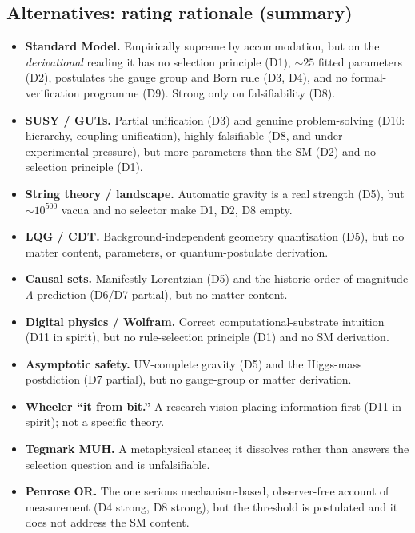 \documentclass[11pt]{article}
\begin{document}
\begin{appendices}
\subsection*{Alternatives: rating rationale (summary)}

\begin{itemize}[leftmargin=1.4em,itemsep=2pt]
\item \textbf{Standard Model.}  Empirically supreme by accommodation, but on the
  \emph{derivational} reading it has no selection principle (D1), $\sim 25$ fitted
  parameters (D2), postulates the gauge group and Born rule (D3, D4), and no
  formal-verification programme (D9).  Strong only on falsifiability (D8).
\item \textbf{SUSY / GUTs.}  Partial unification (D3) and genuine problem-solving
  (D10: hierarchy, coupling unification), highly falsifiable (D8, and under
  experimental pressure), but more parameters than the SM (D2) and no selection
  principle (D1).
\item \textbf{String theory / landscape.}  Automatic gravity is a real strength
  (D5), but $\sim 10^{500}$ vacua and no selector make D1, D2, D8 empty.
\item \textbf{LQG / CDT.}  Background-independent geometry quantisation (D5), but
  no matter content, parameters, or quantum-postulate derivation.
\item \textbf{Causal sets.}  Manifestly Lorentzian (D5) and the historic
  order-of-magnitude $\Lambda$ prediction (D6/D7 partial), but no matter content.
\item \textbf{Digital physics / Wolfram.}  Correct computational-substrate
  intuition (D11 in spirit), but no rule-selection principle (D1) and no SM
  derivation.
\item \textbf{Asymptotic safety.}  UV-complete gravity (D5) and the Higgs-mass
  postdiction (D7 partial), but no gauge-group or matter derivation.
\item \textbf{Wheeler ``it from bit.''}  A research vision placing information
  first (D11 in spirit); not a specific theory.
\item \textbf{Tegmark MUH.}  A metaphysical stance; it dissolves rather than answers
  the selection question and is unfalsifiable.
\item \textbf{Penrose OR.}  The one serious mechanism-based, observer-free account of
  measurement (D4 strong, D8 strong), but the threshold is postulated and it does
  not address the SM content.
\end{itemize}


\end{appendices}
\end{document}
